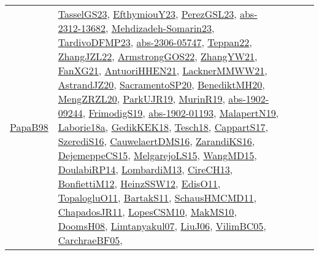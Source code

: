 {\begin{longtable}{lp{3cm}>{\raggedright}p{6cm}>{\raggedright}p{6cm}p{8cm}}
\href{articles/PapaB98.pdf}{PapaB98}\cite{PapaB98} & \href{papers/TasselGS23.pdf}{TasselGS23}\cite{TasselGS23}, \href{papers/EfthymiouY23.pdf}{EfthymiouY23}\cite{EfthymiouY23}, \href{papers/PerezGSL23.pdf}{PerezGSL23}\cite{PerezGSL23}, \href{articles/abs-2312-13682.pdf}{abs-2312-13682}\cite{abs-2312-13682}, \href{papers/Mehdizadeh-Somarin23.pdf}{Mehdizadeh-Somarin23}\cite{Mehdizadeh-Somarin23}, \href{papers/TardivoDFMP23.pdf}{TardivoDFMP23}\cite{TardivoDFMP23}, \href{articles/abs-2306-05747.pdf}{abs-2306-05747}\cite{abs-2306-05747}, \href{papers/Teppan22.pdf}{Teppan22}\cite{Teppan22}, \href{papers/ZhangJZL22.pdf}{ZhangJZL22}\cite{ZhangJZL22}, \href{papers/ArmstrongGOS22.pdf}{ArmstrongGOS22}\cite{ArmstrongGOS22}, \href{articles/ZhangYW21.pdf}{ZhangYW21}\cite{ZhangYW21}, \href{articles/FanXG21.pdf}{FanXG21}\cite{FanXG21}, \href{papers/AntuoriHHEN21.pdf}{AntuoriHHEN21}\cite{AntuoriHHEN21}, \href{papers/LacknerMMWW21.pdf}{LacknerMMWW21}\cite{LacknerMMWW21}, \href{articles/AstrandJZ20.pdf}{AstrandJZ20}\cite{AstrandJZ20}, \href{articles/SacramentoSP20.pdf}{SacramentoSP20}\cite{SacramentoSP20}, \href{articles/BenediktMH20.pdf}{BenediktMH20}\cite{BenediktMH20}, \href{articles/MengZRZL20.pdf}{MengZRZL20}\cite{MengZRZL20}, \href{papers/ParkUJR19.pdf}{ParkUJR19}\cite{ParkUJR19}, \href{papers/MurinR19.pdf}{MurinR19}\cite{MurinR19}, \href{articles/abs-1902-09244.pdf}{abs-1902-09244}\cite{abs-1902-09244}, \href{papers/FrimodigS19.pdf}{FrimodigS19}\cite{FrimodigS19}, \href{articles/abs-1902-01193.pdf}{abs-1902-01193}\cite{abs-1902-01193}, \href{papers/MalapertN19.pdf}{MalapertN19}\cite{MalapertN19}, \href{papers/Laborie18a.pdf}{Laborie18a}\cite{Laborie18a}, \href{articles/GedikKEK18.pdf}{GedikKEK18}\cite{GedikKEK18}, \href{papers/Tesch18.pdf}{Tesch18}\cite{Tesch18}, \href{papers/CappartS17.pdf}{CappartS17}\cite{CappartS17}, \href{papers/SzerediS16.pdf}{SzerediS16}\cite{SzerediS16}, \href{papers/CauwelaertDMS16.pdf}{CauwelaertDMS16}\cite{CauwelaertDMS16}, \href{articles/ZarandiKS16.pdf}{ZarandiKS16}\cite{ZarandiKS16}, \href{papers/DejemeppeCS15.pdf}{DejemeppeCS15}\cite{DejemeppeCS15}, \href{papers/MelgarejoLS15.pdf}{MelgarejoLS15}\cite{MelgarejoLS15}, \href{articles/WangMD15.pdf}{WangMD15}\cite{WangMD15}, \href{papers/DoulabiRP14.pdf}{DoulabiRP14}\cite{DoulabiRP14}, \href{papers/LombardiM13.pdf}{LombardiM13}\cite{LombardiM13}, \href{papers/CireCH13.pdf}{CireCH13}\cite{CireCH13}, \href{papers/BonfiettiM12.pdf}{BonfiettiM12}\cite{BonfiettiM12}, \href{articles/HeinzSSW12.pdf}{HeinzSSW12}\cite{HeinzSSW12}, \href{papers/EdisO11.pdf}{EdisO11}\cite{EdisO11}, \href{articles/TopalogluO11.pdf}{TopalogluO11}\cite{TopalogluO11}, \href{articles/BartakS11.pdf}{BartakS11}\cite{BartakS11}, \href{articles/SchausHMCMD11.pdf}{SchausHMCMD11}\cite{SchausHMCMD11}, \href{papers/ChapadosJR11.pdf}{ChapadosJR11}\cite{ChapadosJR11}, \href{articles/LopesCSM10.pdf}{LopesCSM10}\cite{LopesCSM10}, \href{papers/MakMS10.pdf}{MakMS10}\cite{MakMS10}, \href{papers/DoomsH08.pdf}{DoomsH08}\cite{DoomsH08}, \href{papers/Limtanyakul07.pdf}{Limtanyakul07}\cite{Limtanyakul07}, \href{papers/LiuJ06.pdf}{LiuJ06}\cite{LiuJ06}, \href{articles/VilimBC05.pdf}{VilimBC05}\cite{VilimBC05}, \href{papers/CarchraeBF05.pdf}{CarchraeBF05}\cite{CarchraeBF05}, 
\end{longtable}}
